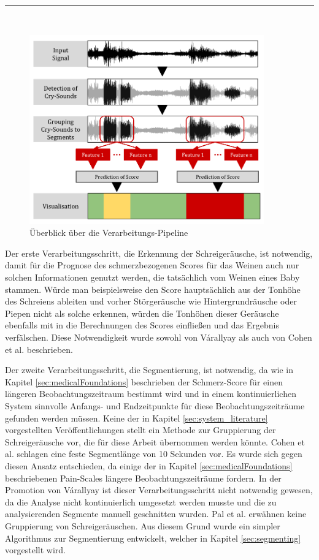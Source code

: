 \noindent\rule{\linewidth}{0.3pt} \\

\begin{figure}[h]
	\centering
	\includegraphics[width=0.9\textwidth]{bilder/konzept03.png}
	\caption{Überblick über die Verarbeitungs-Pipeline}
	\label{img:architecture-overview}
\end{figure}

Der erste Verarbeitungsschritt, die Erkennung der Schreigeräusche, ist notwendig, damit für die Prognose des schmerzbezogenen Scores für das Weinen auch nur solchen Informationen genutzt werden, die tatsächlich vom Weinen eines Baby stammen. Würde man beispielsweise den Score hauptsächlich aus der Tonhöhe des Schreiens ableiten und vorher Störgeräusche wie Hintergrundräusche oder Piepen nicht als solche erkennen, würden die Tonhöhen dieser Geräusche ebenfalls mit in die Berechnungen des Scores einfließen und das Ergebnis verfälschen. Diese Notwendigkeit wurde sowohl von Várallyay \cite{cry_thesis} als auch von Cohen et al. \cite{cohenCry} beschrieben. 

Der zweite Verarbeitungsschritt, die Segmentierung, ist notwendig, da wie in Kapitel \ref{sec:medicalFoundations} beschrieben der Schmerz-Score für einen längeren Beobachtungszeitraum bestimmt wird und in einem kontinuierlichen System sinnvolle Anfangs- und Endzeitpunkte für diese Beobachtungszeiträume gefunden werden müssen. Keine der in Kapitel \ref{sec:system_literature} vorgestellten Veröffentlichungen stellt ein Methode zur Gruppierung der Schreigeräusche vor, die für diese Arbeit übernommen werden könnte. Cohen et al. \cite{cohenCry} schlagen eine feste Segmentlänge von 10 Sekunden vor. Es wurde sich gegen diesen Ansatz entschieden, da einige der in Kapitel \ref{sec:medicalFoundations} beschriebenen Pain-Scales längere Beobachtungszeiträume fordern. In der Promotion von Várallyay \cite{cry_thesis} ist dieser Verarbeitungsschritt nicht notwendig gewesen, da die Analyse nicht kontinuierlich umgesetzt werden musste und die zu analysierenden Segmente manuell geschnitten wurden. Pal et al. \cite{palEmotion} erwähnen keine Gruppierung von Schreigeräuschen. Aus diesem Grund wurde ein simpler Algorithmus zur Segmentierung entwickelt, welcher in Kapitel \ref{sec:segmenting} vorgestellt wird.

